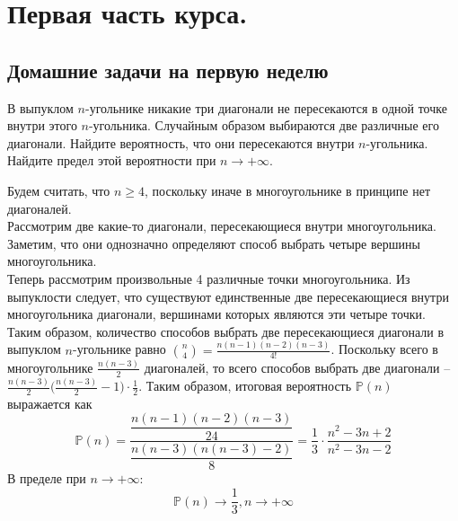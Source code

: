 \section{Первая часть курса.}
\subsection{Домашние задачи на первую неделю}
\begin{problem}
    В выпуклом $n$-угольнике никакие три диагонали не пересекаются в одной точке внутри этого $n$-угольника. Случайным образом выбираются две различные его диагонали. Найдите вероятность, что они пересекаются внутри $n$-угольника. Найдите предел этой вероятности при $n \rightarrow +\infty$.
\end{problem}
\begin{solution}
    Будем считать, что $n \geq 4$, поскольку иначе в многоугольнике в принципе нет диагоналей. \\
    Рассмотрим две какие-то диагонали, пересекающиеся внутри многоугольника. Заметим, что они однозначно определяют способ выбрать четыре вершины многоугольника. \\
    Теперь рассмотрим произвольные 4 различные точки многоугольника. Из выпуклости следует, что существуют единственные две пересекающиеся внутри многоугольника диагонали, вершинами которых являются эти четыре точки. Таким образом, количество способов выбрать две пересекающиеся диагонали в выпуклом $n$-угольнике равно $\binom{n}{4} = \frac{n(n -1)(n - 2)(n - 3)}{4!}$. Поскольку всего в многоугольнике $\frac{n(n - 3)}{2}$ диагоналей, то всего способов выбрать две диагонали -- $\frac{n(n - 3)}{2}\bigg(\frac{n(n - 3)}{2} - 1\bigg)\cdot \frac{1}{2}$. Таким образом, итоговая вероятность $\mathbb{P}(n)$ выражается как \[
                                                                                                                                                                                                                                                                                                                                                                                                                                                                                                                                                                                                                                                \mathbb{P}(n) = \dfrac{\dfrac{n(n - 1)(n - 2)(n - 3)}{24}}{\dfrac{n(n - 3)(n(n - 3) - 2)}{8}} = \dfrac{1}{3}\cdot \dfrac{n^2 - 3n + 2}{n^2 - 3n - 2}
    \]
    В пределе при $n \rightarrow +\infty$: \[
                                               \mathbb{P}(n) \rightarrow \dfrac{1}{3}, n \rightarrow +\infty
    \]
\end{solution}

